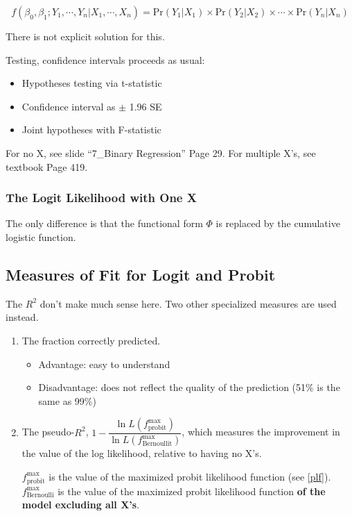 \documentclass{article}
\begin{document}
\[
	f(\beta_0, \beta_1; Y_1, \cdots, Y_n | X_1, \cdots, X_n) =
	\text{Pr}(Y_1|X_1) \times  \text{Pr}(Y_2|X_2) \times \cdots \times \text{Pr}(Y_n|X_n)
\]

There is not explicit solution for this.

Testing, confidence intervals proceeds as usual:
\begin{itemize}
	\item Hypotheses testing via t-statistic
	\item Confidence interval as $\pm$ 1.96 SE
	\item Joint hypotheses with F-statistic
\end{itemize}

For no X, see slide ``7\_Binary Regression'' Page 29.
For multiple X's, see textbook Page 419.


\subsubsection{The Logit Likelihood with One X}

The only difference is that the functional form $\Phi$ is replaced by the cumulative logistic function.

\subsection{Measures of Fit for Logit and Probit}

The $R^2$ don't make much sense here. Two other specialized measures are used instead.

\begin{enumerate}
	\item The fraction correctly predicted.
		\begin{itemize}
			\item Advantage: easy to understand
			\item Disadvantage: does not reflect the quality of the prediction (51\% is the same as 99\%)
		\end{itemize}
  \item The pseudo-$R^2$, $1-\dfrac{\ln L(f^{\max}_{\text{probit}})}{\ln L(f^{\max}_{\text{Bernoullit}})}$,
					which measures the improvement in the value of the log likelihood, relative to having no X's.

					$f^{\max}_{\text{probit}}$ is the value of the maximized probit likelihood function (see \ref{plf}).
					$f^{\max}_{\text{Bernoulli}}$ is the value of the maximized probit likelihood function
					\textbf{of the model excluding all X's}.
\end{enumerate}
\end{document}
